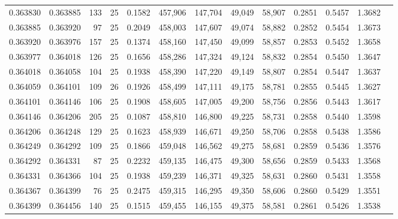 \begin{tabular}{rrrrrrrrrrrrr}
0.363830 & 0.363885 &   133 &  25 &                                     0.1582 & 457,906 & 147,704 &  49,049 &  58,907 & 0.2851 & 0.5457 & 1.3682 \\
0.363885 & 0.363920 &    97 &  25 &                                     0.2049 & 458,003 & 147,607 &  49,074 &  58,882 & 0.2852 & 0.5454 & 1.3673 \\
0.363920 & 0.363976 &   157 &  25 &                                     0.1374 & 458,160 & 147,450 &  49,099 &  58,857 & 0.2853 & 0.5452 & 1.3658 \\
0.363977 & 0.364018 &   126 &  25 &                                     0.1656 & 458,286 & 147,324 &  49,124 &  58,832 & 0.2854 & 0.5450 & 1.3647 \\
0.364018 & 0.364058 &   104 &  25 &                                     0.1938 & 458,390 & 147,220 &  49,149 &  58,807 & 0.2854 & 0.5447 & 1.3637 \\
0.364059 & 0.364101 &   109 &  26 &                                     0.1926 & 458,499 & 147,111 &  49,175 &  58,781 & 0.2855 & 0.5445 & 1.3627 \\
0.364101 & 0.364146 &   106 &  25 &                                     0.1908 & 458,605 & 147,005 &  49,200 &  58,756 & 0.2856 & 0.5443 & 1.3617 \\
0.364146 & 0.364206 &   205 &  25 &                                     0.1087 & 458,810 & 146,800 &  49,225 &  58,731 & 0.2858 & 0.5440 & 1.3598 \\
0.364206 & 0.364248 &   129 &  25 &                                     0.1623 & 458,939 & 146,671 &  49,250 &  58,706 & 0.2858 & 0.5438 & 1.3586 \\
0.364249 & 0.364292 &   109 &  25 &                                     0.1866 & 459,048 & 146,562 &  49,275 &  58,681 & 0.2859 & 0.5436 & 1.3576 \\
0.364292 & 0.364331 &    87 &  25 &                                     0.2232 & 459,135 & 146,475 &  49,300 &  58,656 & 0.2859 & 0.5433 & 1.3568 \\
0.364331 & 0.364366 &   104 &  25 &                                     0.1938 & 459,239 & 146,371 &  49,325 &  58,631 & 0.2860 & 0.5431 & 1.3558 \\
0.364367 & 0.364399 &    76 &  25 &                                     0.2475 & 459,315 & 146,295 &  49,350 &  58,606 & 0.2860 & 0.5429 & 1.3551 \\
0.364399 & 0.364456 &   140 &  25 &                                     0.1515 & 459,455 & 146,155 &  49,375 &  58,581 & 0.2861 & 0.5426 & 1.3538 \\

\end{tabular}
